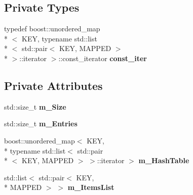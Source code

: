\subsection*{Private Types}
\begin{DoxyCompactItemize}
\item 
\hypertarget{classresultsDB_1_1cLruHashMap_aa6825e373718e1cf5718d784ae3f3c9a}{typedef boost\-::unordered\-\_\-map\\*
$<$ K\-E\-Y, typename std\-::list\\*
$<$ std\-::pair$<$ K\-E\-Y, M\-A\-P\-P\-E\-D $>$\\*
 $>$\-::iterator $>$\-::const\-\_\-iterator {\bfseries const\-\_\-iter}}\label{classresultsDB_1_1cLruHashMap_aa6825e373718e1cf5718d784ae3f3c9a}

\end{DoxyCompactItemize}
\subsection*{Private Attributes}
\begin{DoxyCompactItemize}
\item 
\hypertarget{classresultsDB_1_1cLruHashMap_ab2d2befb97adb02f08257dea126f47ea}{std\-::size\-\_\-t {\bfseries m\-\_\-\-Size}}\label{classresultsDB_1_1cLruHashMap_ab2d2befb97adb02f08257dea126f47ea}

\item 
\hypertarget{classresultsDB_1_1cLruHashMap_a5f15d6ae1f4312e24fc2cad11d0435df}{std\-::size\-\_\-t {\bfseries m\-\_\-\-Entries}}\label{classresultsDB_1_1cLruHashMap_a5f15d6ae1f4312e24fc2cad11d0435df}

\item 
\hypertarget{classresultsDB_1_1cLruHashMap_afcbba62846fc3c7b167fe0abb529dd1a}{boost\-::unordered\-\_\-map$<$ K\-E\-Y, \\*
typename std\-::list$<$ std\-::pair\\*
$<$ K\-E\-Y, M\-A\-P\-P\-E\-D $>$ $>$\-::iterator $>$ {\bfseries m\-\_\-\-Hash\-Table}}\label{classresultsDB_1_1cLruHashMap_afcbba62846fc3c7b167fe0abb529dd1a}

\item 
\hypertarget{classresultsDB_1_1cLruHashMap_ae9194470ecb43ca81b246ee1360e9d59}{std\-::list$<$ std\-::pair$<$ K\-E\-Y, \\*
M\-A\-P\-P\-E\-D $>$ $>$ {\bfseries m\-\_\-\-Items\-List}}\label{classresultsDB_1_1cLruHashMap_ae9194470ecb43ca81b246ee1360e9d59}

\end{DoxyCompactItemize}


